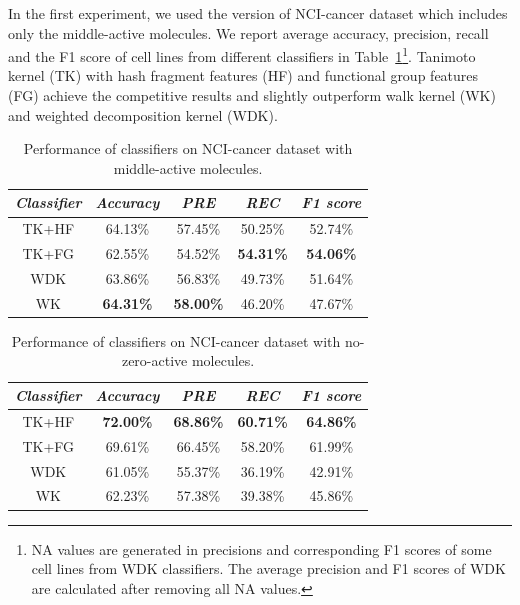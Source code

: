 \documentclass[english]{tktltiki}
\begin{document}
In the first experiment, we used the version of NCI-cancer dataset which includes only the middle-active molecules. We report average accuracy, precision, recall and the F1 score of cell lines from different classifiers in Table~\ref{ncicancer_1}\footnote{NA values are generated in precisions and corresponding F1 scores of some cell lines from WDK classifiers. The average precision and F1 scores of WDK are calculated after removing all NA values.}. Tanimoto kernel (TK) with hash fragment features (HF) and functional group features (FG) achieve the competitive results and slightly outperform walk kernel (WK) and weighted decomposition kernel (WDK). 

\begin{center}
\begin{table}
\centering
\begin{tabular}{|c||c|c|c|c|}\hline
\textbf{\em Classifier}	&\textbf{\em Accuracy } &\textbf{\em PRE } &\textbf{\em REC } &\textbf{\em F1 score } \\ \hline \hline
TK+HF & {64.13\%} & {57.45\%} & {50.25\%} & {52.74\%}\\ \hline
TK+FG & 62.55\% & 54.52\% & \textbf{54.31\%} & \textbf{54.06\%} \\ \hline
WDK & 63.86\% & 56.83\% & 49.73\% & 51.64\% \\ \hline
WK & \textbf{64.31\%} & \textbf{58.00\%} & 46.20\% & 47.67\% \\ \hline
\end{tabular}
\caption[Classifier performances on NCI-cancer dataset 1.]{Performance of classifiers on NCI-cancer dataset with middle-active molecules.}
\label{ncicancer_1}
\end{table}
\end{center}

\begin{center}
\begin{table}
\centering
\begin{tabular}{|c||c|c|c|c|}\hline
\textbf{\em Classifier}	&\textbf{\em Accuracy } &\textbf{\em PRE } &\textbf{\em REC } &\textbf{\em F1 score } \\ \hline \hline
TK+HF & \textbf{72.00\%} & \textbf{68.86\%} & \textbf{60.71\%} & \textbf{64.86\%}\\ \hline
TK+FG & 69.61\% & 66.45\% & {58.20\%} & {61.99\%} \\ \hline
WDK & 61.05\% & 55.37\% & 36.19\% & 42.91\% \\ \hline
WK & 62.23\% & 57.38\% & 39.38\% & 45.86\% \\ \hline
\end{tabular}
\caption[Classifier performances on NCI-cancer dataset 2.]{Performance of classifiers on NCI-cancer dataset with no-zero-active molecules.}
\label{ncicancer_2}
\end{table}
\end{center}
\end{document}
